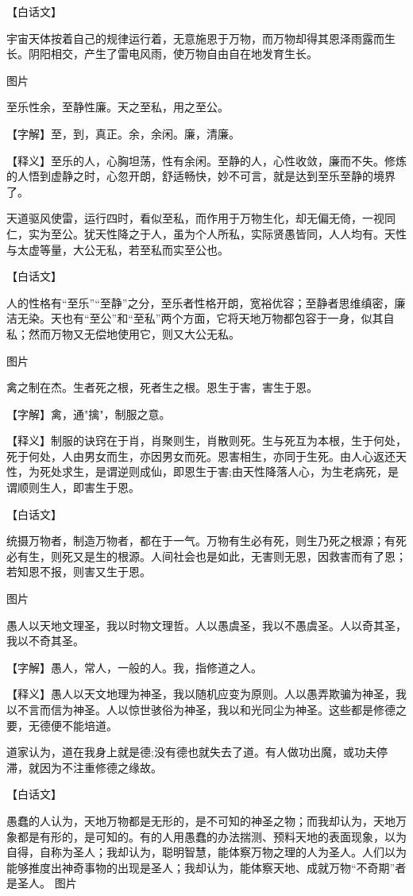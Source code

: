 \documentclass[12pt,UTF8]{ctexbook}
\begin{document}
【白话文】


宇宙天体按着自己的规律运行着，无意施恩于万物，而万物却得其恩泽雨露而生长。阴阳相交，产生了雷电风雨，使万物自由自在地发育生长。


图片​


至乐性余，至静性廉。天之至私，用之至公。


【字解】至，到，真正。余，余闲。廉，清廉。


【释义】至乐的人，心胸坦荡，性有余闲。至静的人，心性收敛，廉而不失。修炼的人悟到虚静之时，心忽开朗，舒适畅快，妙不可言，就是达到至乐至静的境界了。


天道驱风使雷，运行四时，看似至私，而作用于万物生化，却无偏无倚，一视同仁，实为至公。犹天性降之于人，虽为个人所私，实际贤愚皆同，人人均有。天性与太虚等量，大公无私，若至私而实至公也。


【白话文】


人的性格有“至乐”“至静”之分，至乐者性格开朗，宽裕优容；至静者思维缜密，廉洁无染。天也有“至公”和“至私”两个方面，它将天地万物都包容于一身，似其自私；然而万物又无偿地使用它，则又大公无私。


图片​


禽之制在杰。生者死之根，死者生之根。恩生于害，害生于恩。


【字解】禽，通"擒"，制服之意。


【释义】制服的诀窍在于肖，肖聚则生，肖散则死。生与死互为本根，生于何处，死于何处，人由男女而生，亦因男女而死。恩害相生，亦同于生死。由人心返还天性，为死处求生，是谓逆则成仙，即恩生于害;由天性降落人心，为生老病死，是谓顺则生人，即害生于恩。


【白话文】


统摄万物者，制造万物者，都在于一气。万物有生必有死，则生乃死之根源；有死必有生，则死又是生的根源。人间社会也是如此，无害则无恩，因救害而有了恩；若知恩不报，则害又生于恩。


图片​


愚人以天地文理圣，我以时物文理哲。人以愚虞圣，我以不愚虞圣。人以奇其圣，我以不奇其圣。


【字解】愚人，常人，一般的人。我，指修道之人。


【释义】愚人以天文地理为神圣，我以随机应变为原则。人以愚弄欺骗为神圣，我以不言而信为神圣。人以惊世骇俗为神圣，我以和光同尘为神圣。这些都是修德之要，无德便不能培道。


道家认为，道在我身上就是德;没有德也就失去了道。有人做功出魔，或功夫停滞，就因为不注重修德之缘故。


【白话文】


愚蠢的人认为，天地万物都是无形的，是不可知的神圣之物；而我却认为，天地万象都是有形的，是可知的。有的人用愚蠢的办法揣测、预料天地的表面现象，以为自得，自称为圣人；我却认为，聪明智慧，能体察万物之理的人为圣人。人们以为能够推度出神奇事物的出现是圣人；我却认为，能体察天地、成就万物“不奇期”者是圣人。
图片​
\end{document}
